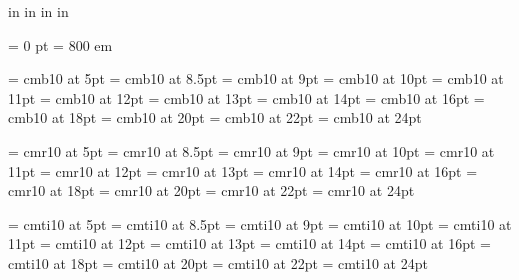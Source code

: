 

 in     %
 in    %
 in  %
 in  %

\nopagenumbers

\parindent = 0 pt
\emergencystretch = 800 em

\font\FFba=      cmb10           at 5pt
\font\FFbb=      cmb10           at 8.5pt
\font\FFbc=      cmb10           at  9pt
\font\FFbd=      cmb10           at 10pt
\font\FFbe=      cmb10           at 11pt
\font\FFbf=      cmb10           at 12pt
\font\FFbg=      cmb10           at 13pt
\font\FFbh=      cmb10           at 14pt
\font\FFbi=      cmb10           at 16pt
\font\FFbj=      cmb10           at 18pt
\font\FFbk=      cmb10           at 20pt
\font\FFbl=      cmb10           at 22pt
\font\FFbm=      cmb10           at 24pt

\font\FFra=      cmr10           at 5pt
\font\FFrb=      cmr10           at 8.5pt
\font\FFrc=      cmr10           at  9pt
\font\FFrd=      cmr10           at 10pt
\font\FFre=      cmr10           at 11pt
\font\FFrf=      cmr10           at 12pt
\font\FFrg=      cmr10           at 13pt
\font\FFrh=      cmr10           at 14pt
\font\FFri=      cmr10           at 16pt
\font\FFrj=      cmr10           at 18pt
\font\FFrk=      cmr10           at 20pt
\font\FFrl=      cmr10           at 22pt
\font\FFrm=      cmr10           at 24pt

\font\FFta=      cmti10           at 5pt
\font\FFtb=      cmti10           at 8.5pt
\font\FFtc=      cmti10           at  9pt
\font\FFtd=      cmti10           at 10pt
\font\FFte=      cmti10           at 11pt
\font\FFtf=      cmti10           at 12pt
\font\FFtg=      cmti10           at 13pt
\font\FFth=      cmti10           at 14pt
\font\FFti=      cmti10           at 16pt
\font\FFtj=      cmti10           at 18pt
\font\FFtk=      cmti10           at 20pt
\font\FFtl=      cmti10           at 22pt
\font\FFtm=      cmti10           at 24pt


\def\filltospace#1#2{{%
  \dimen0=#1\relax
  \dimen0=.5\dimen0
  \vrule height -3pt depth 3.4pt width \dimen0
  \raise1pt\hbox to 0pt{\hss#2\hss}%
  \vrule height -3pt depth 3.4pt width \dimen0
}}

\def\tablerule{\noalign{\hrule}}
  \def\tableskip{~\cr}


